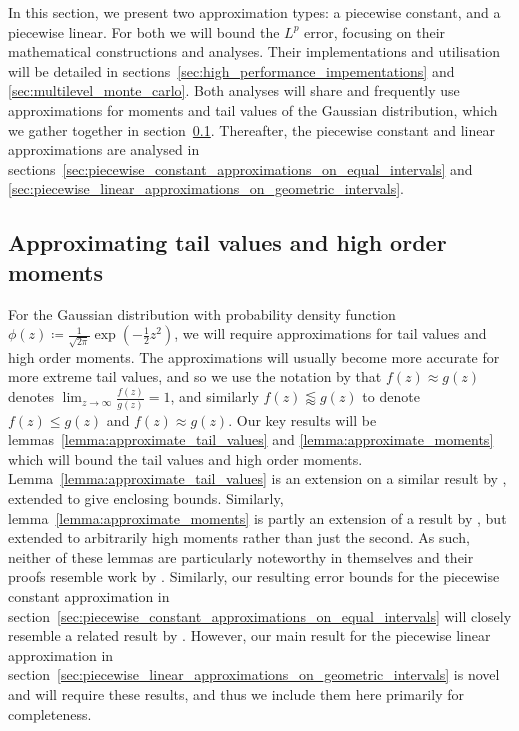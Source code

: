 \documentclass[manuscript,review]{acmart}
\begin{document}
In this section, we present two approximation types: a piecewise constant, and a piecewise linear. For both we will bound the $ L^p $ error, focusing on their mathematical constructions and analyses. Their implementations and utilisation will be detailed in sections~\ref{sec:high_performance_impementations} and \ref{sec:multilevel_monte_carlo}. Both analyses will share and frequently use approximations for moments and tail values of the Gaussian distribution, which we gather together in section~\ref{sec:approximating_tail_values_and_high_order_moments}. Thereafter, the piecewise constant and linear approximations are analysed in sections~\ref{sec:piecewise_constant_approximations_on_equal_intervals} and \ref{sec:piecewise_linear_approximations_on_geometric_intervals}.

\subsection{Approximating tail values and high order moments}
\label{sec:approximating_tail_values_and_high_order_moments}

For the Gaussian distribution with probability density function $ \phi(z) \coloneqq \tfrac{1}{\sqrt{2\pi}} {\exp}(-\tfrac{1}{2}z^2) $, we will require approximations for tail values and high order moments. The approximations will usually become more accurate for more extreme tail values, and so we use the notation by \citet{giles2019random_quadrature} that $ f(z) \approx g(z) $ denotes $ \lim_{z\to\infty} \tfrac{f(z)}{g(z)} = 1 $, and similarly $ f(z) \lessapprox g(z) $ to denote $ f(z) \leq g(z) $ and $ f(z) \approx g(z) $. Our key results will be lemmas~\ref{lemma:approximate_tail_values} and \ref{lemma:approximate_moments} which will bound the tail values and high order moments. Lemma~\ref{lemma:approximate_tail_values} is an extension on a similar result by \citet[lemma~7]{giles2019random_quadrature}, extended to give enclosing bounds. Similarly, lemma~\ref{lemma:approximate_moments} is partly an extension of a result by \citet[lemma~9]{giles2019random_quadrature}, but extended to arbitrarily high moments rather than just the second. As such, neither of these lemmas are particularly noteworthy in themselves and their proofs resemble work by \citet[appendix~A]{giles2019random_quadrature}. Similarly, our resulting error bounds for the piecewise constant approximation in section~\ref{sec:piecewise_constant_approximations_on_equal_intervals} will closely resemble a related result by \citet[theorem~1]{giles2019random_quadrature}. However, our main result for the piecewise linear approximation in section~\ref{sec:piecewise_linear_approximations_on_geometric_intervals} is novel and will require these results, and thus we include them here primarily for completeness. 
\end{document}
